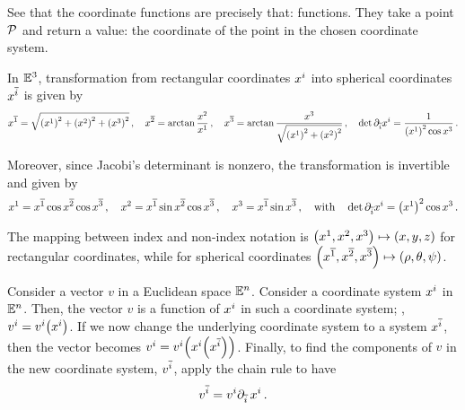 \begin{note}
  See that the coordinate functions are precisely that: functions. They take a point $\point P$ and return a value: the coordinate of the point in the chosen coordinate system.  
\end{note}


\begin{example}
  In $\mathbb{E}^{3}$, transformation from rectangular coordinates $\tvec\pos i$ into spherical coordinates $\atvec\pos i$ is given by
  \begin{equation}\label{eq:rectangulartosphericaltransformation}
    \atvec\pos 1 = \sqrt{\parens{\tvec\pos 1}^2 + \parens{\tvec\pos 2}^2 + \parens{\tvec\pos 3}^2}    \,, \quad
    \atvec\pos 2 = \arctan\dfrac{\tvec\pos 2}{\tvec\pos 1}                                            \,, \quad
    \atvec\pos 3 = \arctan\dfrac{\tvec\pos 3}{\sqrt{\parens{\tvec\pos 1}^2 + \parens{\tvec\pos 2}^2}} \,, \quad
    \det\aipd i\tvec\pos i = \dfrac{1}{\parens{\tvec\pos 1}^2\cos\tvec\pos 3}                         \,.
  \end{equation}
  
  Moreover, since Jacobi's determinant is nonzero, the transformation is invertible and given by
  \begin{equation*}
    \tvec\pos 1 = \atvec\pos 1\cos\atvec\pos 2\cos\atvec\pos 3      \,,\quad
    \tvec\pos 2 = \atvec\pos 1\sin\atvec\pos 2\cos\atvec\pos 3      \,,\quad
    \tvec\pos 3 = \atvec\pos 1\sin\atvec\pos 3                      \,,\quad\text{with}\quad
    \det\aipd i\tvec\pos i = \parens{\tvec\pos 1}^2\cos\tvec\pos 3  \,.
  \end{equation*}
\end{example}

\begin{remark}
  The mapping between index and non-index notation is $\tuple{\tvec\pos 1,\tvec\pos 2,\tvec\pos 3}\mapsto\tuple{\xpos,\ypos,\zpos}$ for rectangular coordinates, while for spherical coordinates $\tuple{\atvec\pos 1, \atvec\pos 2, \atvec\pos 3}\mapsto\tuple{\sxpos,\sypos,\szpos}$.
\end{remark}

\begin{remark}
    Consider a vector $v$ in a Euclidean space $\mathbb{E}^{n}$. Consider a coordinate system $\tvec\pos i$ in $\mathbb{E}^{n}$. Then, the vector $v$ is a function of $\tvec\pos i$ in such a coordinate system; \viz, $\tvec vi = \tvec vi\vat{\tvec\pos i}$. If we now change the underlying coordinate system to a system $\atvec\pos i$, then the vector becomes $\tvec vi = \tvec vi\vat{\tvec\pos i\vat{\atvec\pos i}}$. Finally, to find the components of $v$ in the new coordinate system, $\atvec vi$, apply the chain rule to have
    \begin{equation*}
      \atvec vi = \tvec vi\aipd i\,\tvec\pos i\,.
    \end{equation*}
\end{remark}


